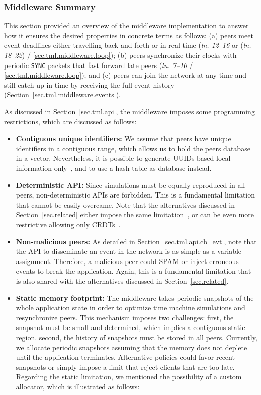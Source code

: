 \documentclass[fleqn,10pt]{SelfArx}
\newcommand{\code}[1]  {\texttt{\footnotesize{#1}}}
\newcommand{\lin}[1]{(\emph{ln. #1}\xspace)}
\newcommand{\linx}[1]{\emph{ln. #1}\xspace}
\begin{document}
\subsubsection{Middleware Summary}
\label{sec.tml.middleware.summary}

This section provided an overview of the middleware implementation to answer
how it ensures the desired properties in concrete terms as follows:
    (a) peers meet event deadlines either travelling back and forth or in real
        time (\linx{12--16} or \lin{18--22} / \ref{sec.tml.middleware.loop});
    (b) peers synchronize their clocks with periodic \code{SYNC} packets that
        fast forward late peers
        (\linx{7--10} / \ref{sec.tml.middleware.loop}); and
    (c) peers can join the network at any time and still catch up in time by
        receiving the full event history
        (Section~\ref{sec.tml.middleware.events}).

As discussed in Section~\ref{sec.tml.api}, the middleware imposes some
programming restrictions, which are discussed as follows:

\begin{itemize}
%
\item \textbf{Contiguous unique identifiers:}
We assume that peers have unique identifiers in a contiguous range, which
allows us to hold the peers database in a vector.
Nevertheless, it is possible to generate UUIDs based local information
only~\cite{p2p.id}, and to use a hash table as database instead.
%
\item \textbf{Deterministic API:}
Since simulations must be equally reproduced in all peers, non-deterministic
APIs are forbidden.
This is a fundamental limitation that cannot be easily overcame.
Note that the alternatives discussed in Section~\ref{sec.related} either impose
the same limitation~\cite{croquet,gals}, or can be even more restrictive
allowing only CRDTs~\cite{crdts}.
%
\item \textbf{Non-malicious peers:}
As detailed in Section~\ref{sec.tml.api.cb_evt}, note that the API to
disseminate an event in the network is as simple as a variable assignment.
Therefore, a malicious peer could SPAM or inject erroneous events to break the
application.
Again, this is a fundamental limitation that is also shared with the
alternatives discussed in Section~\ref{sec.related}.
%
\item \textbf{Static memory footprint:}
The middleware takes periodic snapshots of the whole application state in order
to optimize time machine simulations and resynchronize peers.
This mechanism imposes two challenges:
first, the snapshot must be small and determined, which implies a contiguous
static region.
second, the history of snapshots must be stored in all peers.
Currently, we allocate periodic snapshots assuming that the memory does not
deplete until the application terminates.
Alternative policies could favor recent snapshots or simply impose a limit that
reject clients that are too late.
Regarding the static limitation, we mentioned the possibility of a custom
allocator, which is illustrated as follows:
\end{itemize}
\end{document}
